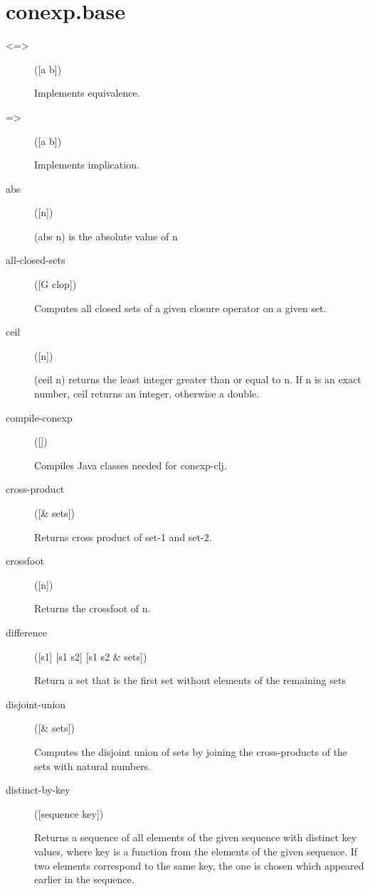 \section{conexp.base}
\begin{description}
  \item[<=>]
([a b])

Implements equivalence.

  \item[=>]
([a b])

Implements implication.

  \item[abs]
([n])

(abs n) is the absolute value of n

  \item[all-closed-sets]
([G clop])

Computes all closed sets of a given closure operator on a given set.

  \item[ceil]
([n])

(ceil n) returns the least integer greater than or equal to n.
If n is an exact number, ceil returns an integer, otherwise a double.

  \item[compile-conexp]
([])

Compiles Java classes needed for conexp-clj.

  \item[cross-product]
([\& sets])

Returns cross product of set-1 and set-2.

  \item[crossfoot]
([n])

Returns the crossfoot of n.

  \item[difference]
([s1] [s1 s2] [s1 s2 \& sets])

Return a set that is the first set without elements of the remaining sets

  \item[disjoint-union]
([\& sets])

Computes the disjoint union of sets by joining the cross-products of the
  sets with natural numbers.

  \item[distinct-by-key]
([sequence key])

Returns a sequence of all elements of the given sequence with distinct key values,
  where key is a function from the elements of the given sequence. If two elements
  correspond to the same key, the one is chosen which appeared earlier in the sequence.


\end{description}
